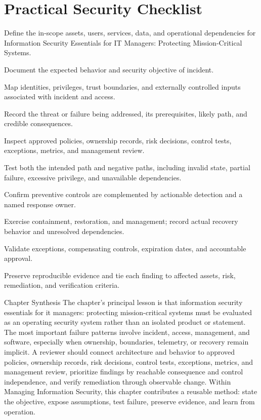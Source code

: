 \documentclass[11pt,letterpaper]{article}
\begin{document}
\section*{Practical Security Checklist}
\begin{CornellChecklist}
\item Define the in-scope assets, users, services, data, and operational dependencies for Information Security Essentials for IT Managers: Protecting Mission-Critical Systems.
\item Document the expected behavior and security objective of incident.
\item Map identities, privileges, trust boundaries, and externally controlled inputs associated with incident and access.
\item Record the threat or failure being addressed, its prerequisites, likely path, and credible consequences.
\item Inspect approved policies, ownership records, risk decisions, control tests, exceptions, metrics, and management review.
\item Test both the intended path and negative paths, including invalid state, partial failure, excessive privilege, and unavailable dependencies.
\item Confirm preventive controls are complemented by actionable detection and a named response owner.
\item Exercise containment, restoration, and management; record actual recovery behavior and unresolved dependencies.
\item Validate exceptions, compensating controls, expiration dates, and accountable approval.
\item Preserve reproducible evidence and tie each finding to affected assets, risk, remediation, and verification criteria.
\end{CornellChecklist}
\begin{CornellSummaryBox}{Chapter Synthesis}
The chapter's principal lesson is that information security essentials for it managers: protecting mission-critical systems must be evaluated as an operating security system rather than an isolated product or statement. The most important failure patterns involve incident, access, management, and software, especially when ownership, boundaries, telemetry, or recovery remain implicit. A reviewer should connect architecture and behavior to approved policies, ownership records, risk decisions, control tests, exceptions, metrics, and management review, prioritize findings by reachable consequence and control independence, and verify remediation through observable change. Within Managing Information Security, this chapter contributes a reusable method: state the objective, expose assumptions, test failure, preserve evidence, and learn from operation.
\end{CornellSummaryBox}
\end{document}
